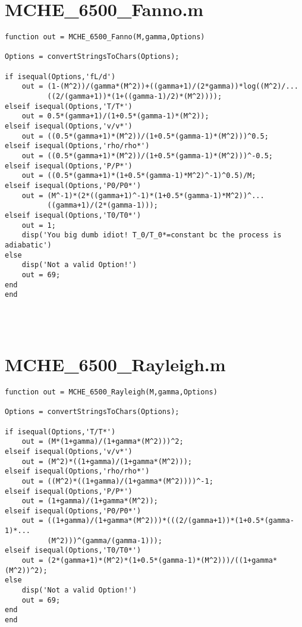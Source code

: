 \documentclass{article}
\begin{document}
\newpage

\section*{MCHE\_6500\_Fanno.m}
\begin{lstlisting}[style=Matlab-editor]
function out = MCHE_6500_Fanno(M,gamma,Options)

Options = convertStringsToChars(Options);

if isequal(Options,'fL/d')
    out = (1-(M^2))/(gamma*(M^2))+((gamma+1)/(2*gamma))*log((M^2)/...
          ((2/(gamma+1))*(1+((gamma-1)/2)*(M^2))));
elseif isequal(Options,'T/T*')
    out = 0.5*(gamma+1)/(1+0.5*(gamma-1)*(M^2));
elseif isequal(Options,'v/v*')
    out = ((0.5*(gamma+1)*(M^2))/(1+0.5*(gamma-1)*(M^2)))^0.5;
elseif isequal(Options,'rho/rho*')
    out = ((0.5*(gamma+1)*(M^2))/(1+0.5*(gamma-1)*(M^2)))^-0.5;
elseif isequal(Options,'P/P*')
    out = ((0.5*(gamma+1)*(1+0.5*(gamma-1)*M^2)^-1)^0.5)/M;
elseif isequal(Options,'P0/P0*')
    out = (M^-1)*(2*((gamma+1)^-1)*(1+0.5*(gamma-1)*M^2))^...
          ((gamma+1)/(2*(gamma-1)));
elseif isequal(Options,'T0/T0*')
    out = 1;
    disp('You big dumb idiot! T_0/T_0*=constant bc the process is adiabatic')
else
    disp('Not a valid Option!')
    out = 69;
end
end




\end{lstlisting}

\section*{MCHE\_6500\_Rayleigh.m}
\begin{lstlisting}[style=Matlab-editor]
function out = MCHE_6500_Rayleigh(M,gamma,Options)

Options = convertStringsToChars(Options);

if isequal(Options,'T/T*')
    out = (M*(1+gamma)/(1+gamma*(M^2)))^2;
elseif isequal(Options,'v/v*')
    out = (M^2)*((1+gamma)/(1+gamma*(M^2)));
elseif isequal(Options,'rho/rho*')
    out = ((M^2)*((1+gamma)/(1+gamma*(M^2))))^-1;
elseif isequal(Options,'P/P*')
    out = (1+gamma)/(1+gamma*(M^2));
elseif isequal(Options,'P0/P0*')
    out = ((1+gamma)/(1+gamma*(M^2)))*(((2/(gamma+1))*(1+0.5*(gamma-1)*...
          (M^2)))^(gamma/(gamma-1)));
elseif isequal(Options,'T0/T0*')
    out = (2*(gamma+1)*(M^2)*(1+0.5*(gamma-1)*(M^2)))/((1+gamma*(M^2))^2);
else
    disp('Not a valid Option!')
    out = 69;
end
end

\end{lstlisting}
\end{document}
